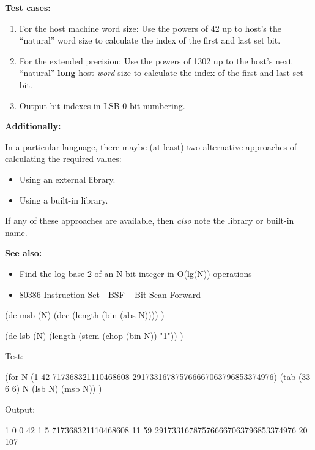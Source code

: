 \textbf{Test cases:}

\begin{enumerate}
\item
  For the host machine word size: Use the powers of 42 up to host's the
  ``natural'' word size to calculate the index of the first and last set
  bit.
\item
  For the extended precision: Use the powers of 1302 up to the host's
  next ``natural'' \textbf{long} host \emph{word} size to calculate the
  index of the first and last set bit.
\item
  Output bit indexes in
  \href{http://en.wikipedia.org/wiki/Bit\_numbering\#LSB\_0\_bit\_numbering}{LSB
  0 bit numbering}.
\end{enumerate}

\textbf{Additionally:}

In a particular language, there maybe (at least) two alternative
approaches of calculating the required values:

\begin{itemize}
\item
  Using an external library.
\item
  Using a built-in library.
\end{itemize}

If any of these approaches are available, then \emph{also} note the
library or built-in name.

\textbf{See also:}

\begin{itemize}
\item
  \href{http://graphics.stanford.edu/~seander/bithacks.html\#IntegerLog}{Find
  the log base 2 of an N-bit integer in O(lg(N)) operations}
\item
  \href{http://pdos.csail.mit.edu/6.858/2011/readings/i386/BSF.htm}{80386
  Instruction Set - BSF -- Bit Scan Forward}
\end{itemize}



\begin{wideverbatim}

(de msb (N)
   (dec (length (bin (abs N)))) )

(de lsb (N)
   (length (stem (chop (bin N)) "1")) )

Test:

(for N (1 42 717368321110468608 291733167875766667063796853374976)
   (tab (33 6 6) N (lsb N) (msb N)) )

Output:

                                1     0     0
                               42     1     5
               717368321110468608    11    59
291733167875766667063796853374976    20   107

\end{wideverbatim}

